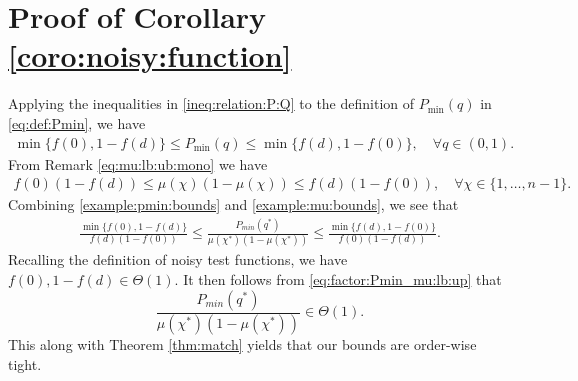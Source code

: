 \documentclass[onecolumn,letterpaper]{IEEEtran}
\newcommand{\cp}{{q}}
\newcommand{\pmin}{{P_{\min}(\cp)}}
\newcommand{\cpn}{{\cp^*}}
\newcommand{\pminn}{{P_{min}(\cpn)}}
\newcommand{\plsize}{{\chi}}
\newcommand{\mean}{{\mu}}
\begin{document}
\section{Proof of Corollary \ref{coro:noisy:function}}
\label{app:coro:noisy}
\begin{IEEEproof}
Applying the inequalities in \eqref{ineq:relation:P:Q} to the definition of $\pmin$ in \eqref{eq:def:Pmin}, we have
\begin{align}
\label{example:pmin:bounds}
   \min\{f(0) ,1-f(d)\}\leq \pmin \leq \min\{f(d) ,1-f(0)\}, \quad \forall \cp\in(0,1).
\end{align}
From Remark \ref{eq:mu:lb:ub:mono} we have
\begin{align}
    \label{example:mu:bounds}
 f(0)(1-f(d))\leq \mean(\plsize)(1- \mean(\plsize))\leq  f(d)(1-f(0)), \quad \forall \plsize\in\{1,\dots,n-1\}.
\end{align}
Combining \eqref{example:pmin:bounds} and \eqref{example:mu:bounds}, we see that 
\begin{align}
\label{eq:factor:Pmin_mu:lb:up}
 \frac{ \min\{f(0) ,1-f(d)\}}{f(d)(1-f(0))}  \leq  \frac{\pminn}{\mean(\plsize^*) \left( 1-\mean(\plsize^*) \right)} \leq \frac{ \min\{f(d) ,1-f(0)\}}{f(0)(1-f(d))}.
\end{align}
Recalling the definition of noisy test functions, we have $f(0),1-f(d)\in \Theta(1)$. It then follows from \eqref{eq:factor:Pmin_mu:lb:up} that $$\frac{\pminn}{\mean(\plsize^*) \left( 1-\mean(\plsize^*) \right)}\in \Theta(1).$$ This along with Theorem \ref{thm:match} yields that our bounds are order-wise tight. %
\end{IEEEproof}
\end{document}
